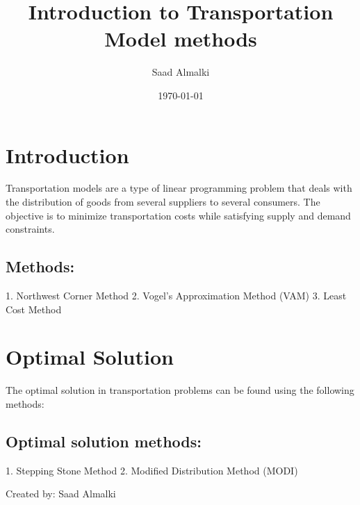 \documentclass[12pt]{article}
\title{Introduction to Transportation Model methods}
\author{Saad Almalki}
\date{\today}
\begin{document}
\maketitle

\section{Introduction} 
Transportation models are a type of linear programming problem that deals with the distribution of goods from several suppliers to several consumers. The objective is to minimize transportation costs while satisfying supply and demand constraints.

\subsection{Methods:}
1. Northwest Corner Method
2. Vogel's Approximation Method (VAM)
3. Least Cost Method

\section{Optimal Solution}
The optimal solution in transportation problems can be found using the following methods:
\subsection{Optimal solution methods:}
1. Stepping Stone Method
2. Modified Distribution Method (MODI)

\begin{flushright}
Created by: Saad Almalki \\
\end{flushright}
\end{document}
